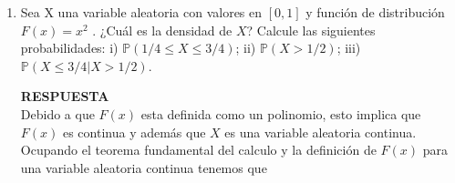 \documentclass[11pt,letterpaper]{article}
\newcommand{\mP}{\mathbb{P}}
\newcommand{\res}{\textbf{RESPUESTA}\\}
\begin{document}
\begin{enumerate}
Determine la función de probabilidad de $X$.

\res 

Recordemos que cuando $X$ es una variable aleatoria, su función de distribución $F$ esta definida como:

\begin{itemize}
\item caso discreto

$$F(x) =\mP(X\leq x)= \sum_{x_i\leq x} f(x_i).$$

\item caso continuo

$$F(x) = \mP(X\leq x)= \int_{-\infty}^x f(t) dt.$$
\end{itemize}
Donde $f$ es la función de probabilidad de $X$. \\

Debido a que $F(x)$ es discontinua en los puntos $x_i$ podemos decir que $X$ es una variable aleatoria discreta.\\
Ahora ocupando lo anterior, podemos decir que:
\begin{itemize}
\item Para $x=0$,
$$ f(x)= \mP(X=0)= F(0)-F({0}^-)=1/2-0=1/2.$$

\item Para $x=1/4$,
$$ f(x)= \mP(X=1/4)= F(1/4)-F({1/4}^-)=3/4-1/2=1/4.$$

\item Para $x=3/4$,
$$ f(x)= \mP(X=3/4)= F(3/4)-F({3/4}^-)=1-3/4=1/4.$$
\end{itemize}
Por lo tanto la función de probabilidad de $X$ es: 

\begin{equation*}
f(x) = \left\{\begin{array}{ll}
1/2 & \text{para } x=0\\
1/4 & \text{para } x =1/4\\
1/4 & \text{para } x=3/4
\end{array} \right.\ \ \ \blacksquare
\end{equation*}

\item Sea X una variable aleatoria con valores en $[0, 1]$ y función de distribución $F(x)=x^2$ . ¿Cuál es
la densidad de $X$? Calcule las siguientes probabilidades: i) $\mP (1/4 \leq X \leq 3/4)$; ii) $\mP (X > 1/2)$;
iii) $\mP (X \leq 3/4|X > 1/2)$.

\res
Debido a que $F(x)$ esta definida como un polinomio, esto implica que $F(x)$ es continua y además que $X$ es una variable aleatoria continua. Ocupando el teorema fundamental del calculo y la definición de $F(x)$ para una variable aleatoria continua tenemos que\\ 


\end{enumerate}
\end{document}
